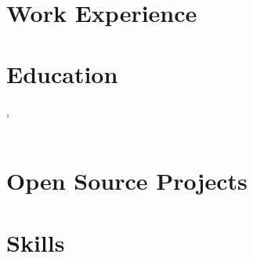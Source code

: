 \documentclass[a4paper,9pt]{extarticle}
\begin{document}


\pagestyle{empty}

\begin{center}
\textbf{\Large \name}\\[4pt]
\href{mailto:\email}{\underline{\email}} \raisebox{0.4ex}{\scalebox{0.5}{$\bullet$}}
\href{tel:\phone}{\underline{\phone}} \raisebox{0.4ex}{\scalebox{0.5}{$\bullet$}}
\href{\linkedinurl}{\underline{\linkedin}} \raisebox{0.4ex}{\scalebox{0.5}{$\bullet$}}
\href{\githuburl}{\underline{\github}}
\end{center}

\noindent
\summary

\section*{Work Experience}

\workexperience

\section*{Education}

\noindent
\textbf{\university}, \universitylocation \hfill \educationdates\\
\textit{\degree} \\[4pt]
\educationdescription

\section*{Open Source Projects}

\opensourceprojects

\section*{Skills}

\skills
\end{document}
